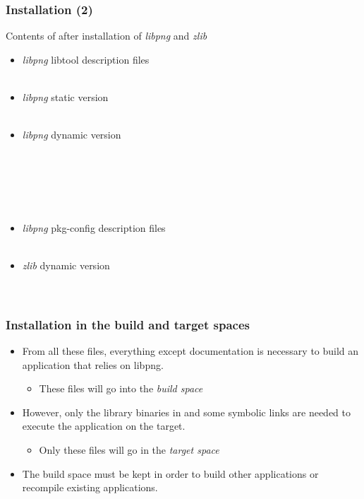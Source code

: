 \begin{frame}
\frametitle{Installation (2)}

Contents of  after installation of {\em libpng} and {\em
  zlib}

\scriptsize
\begin{itemize}
\item {\em libpng} libtool description files\\
  \\
\item {\em libpng} static version\\
  \\
\item {\em libpng} dynamic version\\
  \\
  \\
  \\
  \\
  \\
\item {\em libpng} pkg-config description files\\
  \\
\item {\em zlib} dynamic version\\
  \\
  \\
\end{itemize}
\end{frame}

\begin{frame}
  \frametitle{Installation in the build and target spaces}
  \begin{itemize}
  \item From all these files, everything except documentation is
    necessary to build an application that relies on libpng.
    \begin{itemize}
    \item These files will go into the {\em build space}
    \end{itemize}
  \item However, only the library  binaries in
     and some symbolic links are needed to execute
    the application on the target.
    \begin{itemize}
    \item Only these files will go in the {\em target space}
    \end{itemize}
  \item The build space must be kept in order to build other
    applications or recompile existing applications.
  \end{itemize}
\end{frame}

